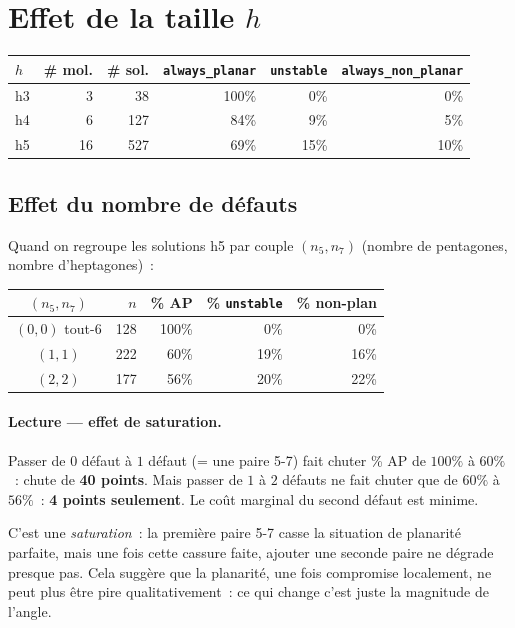 \documentclass[11pt,a4paper]{article}
\begin{document}
\section{Effet de la taille $h$}

\begin{center}
\begin{tabular}{@{}lrrrrr@{}}
\toprule
\textbf{$h$} & \textbf{\# mol.} & \textbf{\# sol.} & \texttt{always\_planar} & \texttt{unstable} & \texttt{always\_non\_planar} \\
\midrule
h3 &  3 &  38 & 100\% &  0\% &  0\% \\
h4 &  6 & 127 &  84\% &  9\% &  5\% \\
h5 & 16 & 527 &  69\% & 15\% & 10\% \\
\bottomrule
\end{tabular}
\end{center}

\subsection{Effet du nombre de défauts}

Quand on regroupe les solutions h5 par couple $(n_5, n_7)$ (nombre de pentagones, nombre d'heptagones)~:

\begin{center}
\begin{tabular}{@{}crrrr@{}}
\toprule
$(n_5, n_7)$ & $n$ & \% AP & \% \texttt{unstable} & \% non-plan \\
\midrule
$(0,0)$ tout-6 & 128 & 100\% &  0\% &  0\% \\
$(1,1)$        & 222 &  60\% & 19\% & 16\% \\
$(2,2)$        & 177 &  56\% & 20\% & 22\% \\
\bottomrule
\end{tabular}
\end{center}

\paragraph{Lecture --- effet de saturation.}
Passer de $0$ défaut à $1$ défaut (= une paire 5-7) fait chuter \% AP de $100\%$ à $60\%$~: chute de \textbf{40 points}. Mais passer de $1$ à $2$ défauts ne fait chuter que de $60\%$ à $56\%$~: \textbf{4 points seulement}. Le coût marginal du second défaut est minime.

C'est une \emph{saturation}~: la première paire 5-7 \og casse \fg{} la situation de planarité parfaite, mais une fois cette cassure faite, ajouter une seconde paire ne dégrade presque pas. Cela suggère que la planarité, une fois compromise localement, ne peut plus être \og pire \fg{} qualitativement~: ce qui change c'est juste la magnitude de l'angle.
\end{document}
